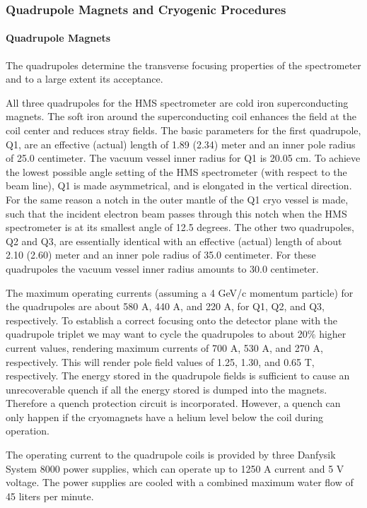 \subsubsection{Quadrupole Magnets and Cryogenic Procedures}

\paragraph{Quadrupole Magnets}
The quadrupoles determine the transverse focusing properties of the spectrometer
and to a large extent its acceptance.

All three quadrupoles for the HMS spectrometer are cold iron superconducting
magnets. The soft iron around the superconducting coil enhances the field at
the coil center and reduces stray fields.
The basic parameters for the first quadrupole, Q1, are an effective (actual)
length of 1.89 (2.34) meter and an inner pole radius of
25.0 centimeter. \cite{bi:yan1}
The vacuum vessel
inner radius for Q1 is 20.05 cm. To achieve the lowest possible angle
setting of the HMS spectrometer (with respect to the beam line), Q1 is
made asymmetrical, and is elongated in the vertical direction. For the same
reason a notch in the outer mantle of the Q1 cryo vessel is made, such
that the incident electron beam passes through this notch when the
HMS spectrometer is at its smallest angle of 12.5 degrees.
The other two quadrupoles, Q2 and Q3, are essentially identical with an
effective (actual) length of about 2.10 (2.60) meter and an inner pole radius
of 35.0 centimeter. For these quadrupoles the vacuum vessel inner radius
amounts to 30.0 centimeter.

The maximum operating currents (assuming a 4 GeV/c momentum particle) for the
quadrupoles are about 580 A, 440 A, and 220 A, for Q1, Q2, and Q3, respectively.
To establish a correct focusing onto the detector plane with
the quadrupole triplet we may want to cycle the quadrupoles to about 20\% higher
current values, rendering maximum currents of 700 A, 530 A, and 270 A,
respectively. This will render pole field values of 1.25, 1.30, and 0.65 T,
respectively.
The energy stored in the quadrupole fields is sufficient to cause an
unrecoverable quench if all the energy stored is dumped into the
magnets. \cite{bi:hms1}
Therefore a quench protection circuit is incorporated. However, a quench
can only happen if the cryomagnets have a helium level below the coil during
operation.

The operating current to the quadrupole coils is provided by three
Danfysik System 8000 power supplies, which can operate up to 1250 A current
and 5 V voltage. The power supplies are cooled with a combined maximum 
water flow of 45 liters per minute.

